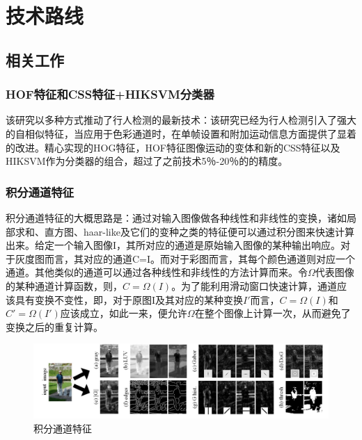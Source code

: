 \chapter{技术路线}

\section{相关工作}
\subsection{HOF特征和CSS特征+HIKSVM分类器\cite{walk2010new}}{
该研究以多种方式推动了行人检测的最新技术：该研究已经为行人检测引入了强大的自相似特征，当应用于色彩通道时，在单帧设置和附加运动信息方面提供了显着的改进。精心实现的HOG特征，HOF特征图像运动的变体和新的CSS特征以及HIKSVM作为分类器的组合，超过了之前技术5％-20％的的精度。
}

\subsection{积分通道特征\cite{integral}}{
积分通道特征的大概思路是：通过对输入图像做各种线性和非线性的变换，诸如局部求和、直方图、haar-like及它们的变种之类的特征便可以通过积分图来快速计算出来。给定一个输入图像I，其所对应的通道是原始输入图像的某种输出响应。对于灰度图而言，其对应的通道C=I。而对于彩图而言，其每个颜色通道则对应一个通道。其他类似的通道可以通过各种线性和非线性的方法计算而来。令$\Omega$代表图像的某种通道计算函数，则，$C=\Omega(I)$。为了能利用滑动窗口快速计算，通道应该具有变换不变性，即，对于原图I及其对应的某种变换$I'$而言，$C=\Omega(I)$和$C'=\Omega(I')$应该成立，如此一来，便允许$\Omega$在整个图像上计算一次，从而避免了变换之后的重复计算。
\begin{figure}[htbp]
\centering
\includegraphics[width=5in]{images/JFTD.png}
\caption{积分通道特征}
\label{JFTD}
\end{figure}
}

